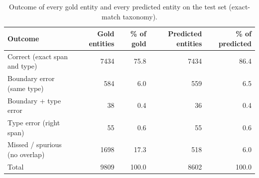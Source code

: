 \begin{table}[t]
\centering
\small
\caption{Outcome of every gold entity and every predicted entity on the test set (exact-match taxonomy).}
\label{tab:outcomes}
\begin{tabular}{lrrrr}
\toprule
Outcome & Gold entities & \% of gold & Predicted entities & \% of predicted \\
\midrule
Correct (exact span and type) & 7434 & 75.8 & 7434 & 86.4 \\
Boundary error (same type) & 584 & 6.0 & 559 & 6.5 \\
Boundary + type error & 38 & 0.4 & 36 & 0.4 \\
Type error (right span) & 55 & 0.6 & 55 & 0.6 \\
Missed / spurious (no overlap) & 1698 & 17.3 & 518 & 6.0 \\
\midrule Total & 9809 & 100.0 & 8602 & 100.0 \\
\bottomrule
\end{tabular}
\end{table}
